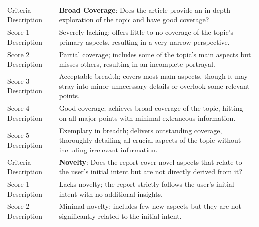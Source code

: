 \documentclass[11pt]{article}
\begin{document}
\begin{table}
{%
\begin{tabular}{ll} 
\toprule
Criteria Description & \textbf{Broad Coverage}: Does the article provide an in-depth exploration of the topic and have good coverage?                                                                                                               \\
Score 1 Description  & Severely lacking; offers little to no coverage of the topic's primary aspects, resulting in a very narrow perspective.                                                                                                                        \\
Score 2 Description  & Partial coverage; includes some of the topic's main aspects but misses others, resulting in an incomplete portrayal.                                                                                                                              \\
Score 3 Description  & Acceptable breadth; covers most main aspects, though it may stray into minor unnecessary details or overlook some relevant points.                                                                                             \\
Score 4 Description  & Good coverage; achieves broad coverage of the topic, hitting on all major points with minimal extraneous information.                                                                      \\
Score 5 Description  & Exemplary in breadth; delivers outstanding coverage, thoroughly detailing all crucial aspects of the topic without including irrelevant information.                                                                                \\ 
\midrule
Criteria Description & \textbf{Novelty}: Does the report cover novel aspects that relate to the user's initial intent but are not directly derived from it?                                                                                              \\
Score 1 Description  & Lacks novelty; the report strictly follows the user's initial intent with no additional insights.                                                                                                                                     \\
Score 2 Description  & Minimal novelty; includes few new aspects but they are not significantly related to the initial intent.                                                                                              \\

\end{tabular}}
\end{table}
\end{document}
